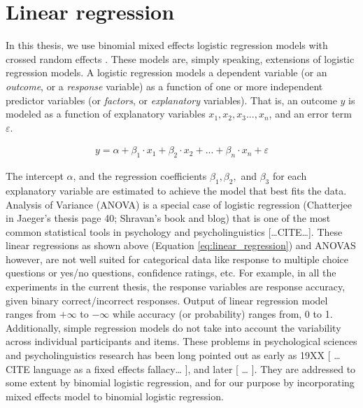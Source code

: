 \documentclass[a4paper, nobind]{templates/ociamthesis}
\begin{document}
\hypertarget{linear-regression}{%
\section{Linear regression}\label{linear-regression}}

In this thesis, we use binomial mixed effects logistic regression models with crossed random effects \autocite{Baayen2008}.
These models are, simply speaking, extensions of logistic regression models.
A logistic regression models a dependent variable (or an \emph{outcome}, or a \emph{response} variable) as a function of one or more independent predictor variables (or \emph{factors}, or \emph{explanatory} variables).
That is, an outcome \(y\) is modeled as a function of explanatory variables \(x_1, x_2, x_3..., x_n\), and an error term \(\varepsilon\).

\begin{align} \label{eq:linear_regression}
y =
\alpha + 
\beta_{1}\cdot{x_1} + 
\beta_{2}\cdot{x_2} + ... +
\beta_{n}\cdot{x_n} + \varepsilon 
\end{align}

The intercept \(\alpha\), and the regression coefficients \(\beta_1, \beta_2,\) and \(\beta_3\) for each explanatory variable are estimated to achieve the model that best fits the data.
Analysis of Variance (ANOVA) is a special case of logistic regression (Chatterjee in Jaeger's thesis page 40; Shravan's book and blog) that is one of the most common statistical tools in psychology and psycholinguistics {[}\ldots CITE\ldots{]}.
These linear regressions as shown above (Equation \ref{eq:linear_regression}) and ANOVAS however, are not well suited for categorical data like response to multiple choice questions or yes/no questions, confidence ratings, etc.
For example, in all the experiments in the current thesis, the response variables are response accuracy, given binary correct/incorrect responses.
Output of linear regression model ranges from \(+\infty\) to \(-\infty\) while accuracy (or probability) ranges from, 0 to 1.
Additionally, simple regression models do not take into account the variability across individual participants and items.
These problems in psychological sciences and psycholinguistics research has been long pointed out as early as 19XX {[} \ldots CITE language as a fixed effects fallacy\ldots{} {]}, and later {[} \ldots{} {]}.
They are addressed to some extent by binomial logistic regression, and for our purpose by incorporating mixed effects model to binomial logistic regression.
\end{document}
